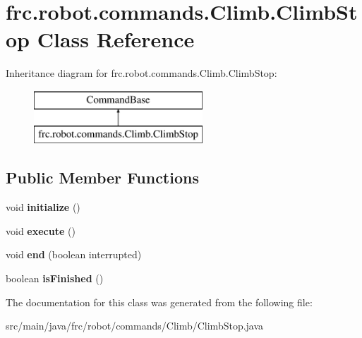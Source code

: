 \hypertarget{classfrc_1_1robot_1_1commands_1_1_climb_1_1_climb_stop}{}\section{frc.\+robot.\+commands.\+Climb.\+Climb\+Stop Class Reference}
\label{classfrc_1_1robot_1_1commands_1_1_climb_1_1_climb_stop}
Inheritance diagram for frc.\+robot.\+commands.\+Climb.\+Climb\+Stop\+:\begin{figure}[H]
\begin{center}
\leavevmode
\includegraphics[height=2.000000cm]{classfrc_1_1robot_1_1commands_1_1_climb_1_1_climb_stop}
\end{center}
\end{figure}
\subsection*{Public Member Functions}
\begin{DoxyCompactItemize}
\item 
\mbox{\label{classfrc_1_1robot_1_1commands_1_1_climb_1_1_climb_stop_a87c18bbe19efc4a18b3edc68374718ac}} 
void {\bfseries initialize} ()
\item 
\mbox{\label{classfrc_1_1robot_1_1commands_1_1_climb_1_1_climb_stop_a160ddf50d31dba0c26442b7095dd9ba9}} 
void {\bfseries execute} ()
\item 
\mbox{\label{classfrc_1_1robot_1_1commands_1_1_climb_1_1_climb_stop_a3bd6b8b003fab8f0e7f5fcf3f4ad787f}} 
void {\bfseries end} (boolean interrupted)
\item 
\mbox{\label{classfrc_1_1robot_1_1commands_1_1_climb_1_1_climb_stop_a5b4a1bcd6a92957a41c551ba9205fbf5}} 
boolean {\bfseries is\+Finished} ()
\end{DoxyCompactItemize}


The documentation for this class was generated from the following file\+:\begin{DoxyCompactItemize}
\item 
src/main/java/frc/robot/commands/\+Climb/Climb\+Stop.\+java\end{DoxyCompactItemize}
